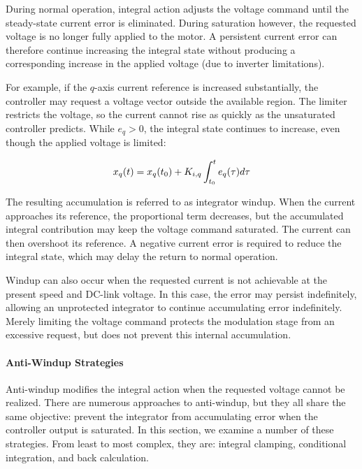 \documentclass{article}
\begin{document}
During normal operation, integral action adjusts the voltage command until the steady-state current error is eliminated. During saturation however, the requested voltage is no longer fully applied to the motor. A persistent current error can therefore continue increasing the integral state without producing a corresponding increase in the applied voltage (due to inverter limitations).

For example, if the $q$-axis current reference is increased substantially, the controller may request a voltage vector outside the available region. The limiter restricts the voltage, so the current cannot rise as quickly as the unsaturated controller predicts. While $e_q > 0$, the integral state continues to increase, even though the applied voltage is limited:

\begin{equation}
    x_q(t) = x_q(t_0) + K_{i,q}\int_{t_0}^{t} e_q(\tau) \space d\tau
\end{equation}

The resulting accumulation is referred to as integrator windup. When the current approaches its reference, the proportional term decreases, but the accumulated integral contribution may keep the voltage command saturated. The current can then overshoot its reference. A negative current error is required to reduce the integral state, which may delay the return to normal operation. 

Windup can also occur when the requested current is not achievable at the present speed and DC-link voltage. In this case, the error may persist indefinitely, allowing an unprotected integrator to continue accumulating error indefinitely. Merely limiting the voltage command protects the modulation stage from an excessive request, but does not prevent this internal accumulation. 

\paragraph{Anti-Windup Strategies}
\label{sec:anti-windup-strategies}

Anti-windup modifies the integral action when the requested voltage cannot be realized. There are numerous approaches to anti-windup, but they all share the same objective: prevent the integrator from accumulating error when the controller output is saturated. In this section, we examine a number of these strategies. From least to most complex, they are: integral clamping, conditional integration, and back calculation.
\end{document}
